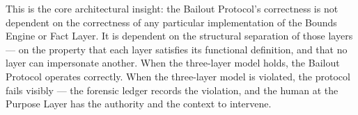 This is the core architectural insight: the Bailout Protocol's correctness is not dependent on the correctness of any particular implementation of the Bounds Engine or Fact Layer. It is dependent on the structural separation of those layers — on the property that each layer satisfies its functional definition, and that no layer can impersonate another. When the three-layer model holds, the Bailout Protocol operates correctly. When the three-layer model is violated, the protocol fails visibly — the forensic ledger records the violation, and the human at the Purpose Layer has the authority and the context to intervene.